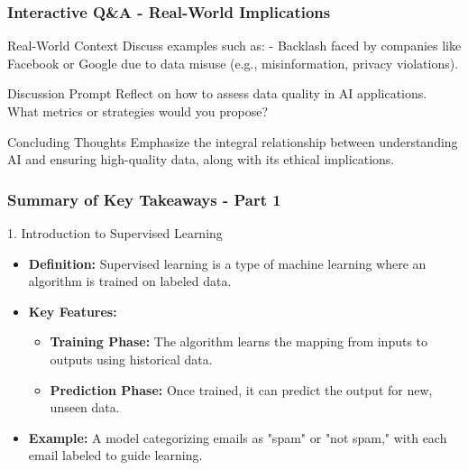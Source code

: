 \documentclass[aspectratio=169]{beamer}
\begin{document}
\begin{frame}[fragile]
    \frametitle{Interactive Q\&A - Real-World Implications}
    \begin{block}{Real-World Context}
        Discuss examples such as: 
        - Backlash faced by companies like Facebook or Google due to data misuse (e.g., misinformation, privacy violations).
    \end{block}
    
    \begin{block}{Discussion Prompt}
        Reflect on how to assess data quality in AI applications. What metrics or strategies would you propose?
    \end{block}
    
    \begin{block}{Concluding Thoughts}
        Emphasize the integral relationship between understanding AI and ensuring high-quality data, along with its ethical implications.
    \end{block}
\end{frame}

\begin{frame}[fragile]
    \frametitle{Summary of Key Takeaways - Part 1}
    \begin{block}{1. Introduction to Supervised Learning}
        \begin{itemize}
            \item \textbf{Definition:} Supervised learning is a type of machine learning where an algorithm is trained on labeled data.
            \item \textbf{Key Features:}
                \begin{itemize}
                    \item \textbf{Training Phase:} The algorithm learns the mapping from inputs to outputs using historical data.
                    \item \textbf{Prediction Phase:} Once trained, it can predict the output for new, unseen data.
                \end{itemize}
            \item \textbf{Example:} A model categorizing emails as "spam" or "not spam," with each email labeled to guide learning.
        \end{itemize}
    \end{block}
\end{frame}
\end{document}
